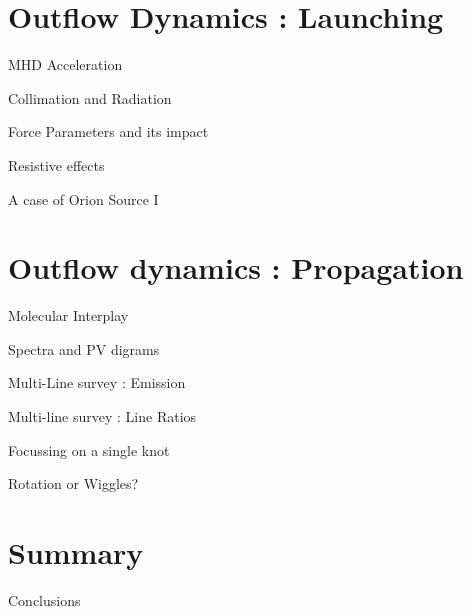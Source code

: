 \documentclass[8pt,xcolor=dvipsnames]{beamer}
\begin{document}
\section{Outflow Dynamics : Launching}
\begin{frame}{MHD Acceleration}
\end{frame}

\begin{frame}{Collimation and Radiation}
\end{frame}

\begin{frame}{Force Parameters and its impact}
\end{frame}

\begin{frame}{Resistive effects}
\end{frame}

\begin{frame}{A case of Orion Source I}
\end{frame}

\section{Outflow dynamics : Propagation}
\begin{frame}{Molecular Interplay}
\end{frame}

\begin{frame}{Spectra and PV digrams}
\end{frame}

\begin{frame}{Multi-Line survey : Emission}
\end{frame}

\begin{frame}{Multi-line survey : Line Ratios}
\end{frame}


\begin{frame}{Focussing on a single knot}
\end{frame}

\begin{frame}{Rotation or Wiggles?}
\end{frame}

\section{Summary}
\begin{frame}{Conclusions}
\end{frame}
\end{document}
